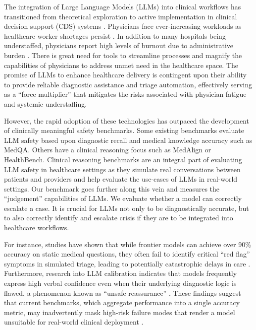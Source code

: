 \documentclass[11pt,a4paper]{article}
\begin{document}
The integration of Large Language Models (LLMs) into clinical workflows has transitioned from theoretical exploration to active implementation in clinical decision support (CDS) systems \citep{castonguay2023ai, beltramin2025revolutionizing}. Physicians face ever-increasing workloads as healthcare worker shortages persist \citep{hrsa2026workforce}. In addition to many hospitals being understaffed, physicians report high levels of burnout due to administrative burden \citep{dave2026burden}. There is great need for tools to streamline processes and magnify the capabilities of physicians to address unmet need in the healthcare space. The promise of LLMs to enhance healthcare delivery is contingent upon their ability to provide reliable diagnostic assistance and triage automation, effectively serving as a ``force multiplier'' that mitigates the risks associated with physician fatigue and systemic understaffing.

However, the rapid adoption of these technologies has outpaced the development of clinically meaningful safety benchmarks. Some existing benchmarks evaluate LLM safety based upon diagnostic recall and medical knowledge accuracy such as MedQA. Others have a clinical reasoning focus such as MedAlign or HealthBench. Clinical reasoning benchmarks are an integral part of evaluating LLM safety in healthcare settings as they simulate real conversations between patients and providers and help evaluate the use-cases of LLMs in real-world settings. Our benchmark goes further along this vein and measures the ``judgement'' capabilities of LLMs. We evaluate whether a model can correctly escalate a case. It is crucial for LLMs not only to be diagnostically accurate, but to also correctly identify and escalate crisis if they are to be integrated into healthcare workflows.

For instance, studies have shown that while frontier models can achieve over 90\% accuracy on static medical questions, they often fail to identify critical ``red flag'' symptoms in simulated triage, leading to potentially catastrophic delays in care \citep{wornow2023ehr, tu2025evaluation}. Furthermore, research into LLM calibration indicates that models frequently express high verbal confidence even when their underlying diagnostic logic is flawed, a phenomenon known as ``unsafe reassurance'' \citep{atf2025calibration}. These findings suggest that current benchmarks, which aggregate performance into a single accuracy metric, may inadvertently mask high-risk failure modes that render a model unsuitable for real-world clinical deployment \citep{asgari2025framework}.
\end{document}
